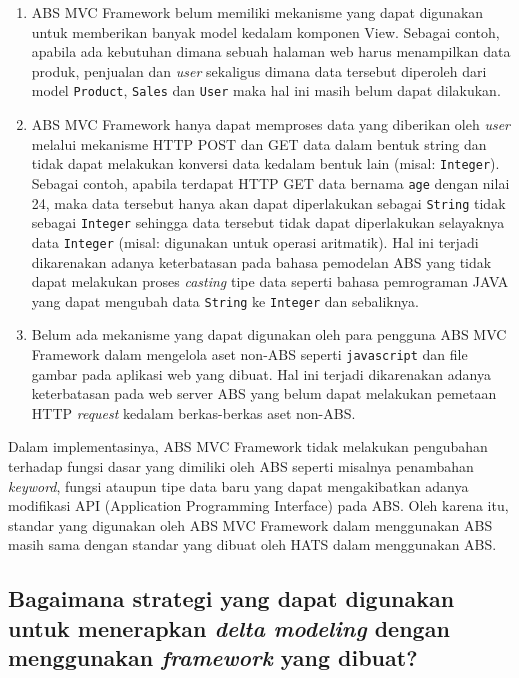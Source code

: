 \begin{enumerate}
    \item ABS MVC Framework belum memiliki mekanisme yang dapat digunakan untuk memberikan banyak model kedalam komponen View. Sebagai contoh, apabila ada kebutuhan dimana sebuah halaman web harus menampilkan data produk, penjualan dan \textit{user} sekaligus dimana data tersebut diperoleh dari model \texttt{Product}, \texttt{Sales} dan \texttt{User} maka hal ini masih belum dapat dilakukan.
    \item ABS MVC Framework hanya dapat memproses data yang diberikan oleh \textit{user} melalui mekanisme HTTP POST dan GET data dalam bentuk string dan tidak dapat melakukan konversi data kedalam bentuk lain (misal: \texttt{Integer}). Sebagai contoh, apabila terdapat HTTP GET data bernama \texttt{age} dengan nilai 24, maka data tersebut hanya akan dapat diperlakukan sebagai \texttt{String} tidak sebagai \texttt{Integer} sehingga data tersebut tidak dapat diperlakukan selayaknya data \texttt{Integer} (misal: digunakan untuk operasi aritmatik). Hal ini terjadi dikarenakan adanya keterbatasan pada bahasa pemodelan ABS yang tidak dapat melakukan proses \textit{casting} tipe data seperti bahasa pemrograman JAVA yang dapat mengubah data \texttt{String} ke \texttt{Integer} dan sebaliknya.
    \item Belum ada mekanisme yang dapat digunakan oleh para pengguna ABS MVC Framework dalam mengelola aset non-ABS seperti \texttt{javascript} dan file gambar pada aplikasi web yang dibuat. Hal ini terjadi dikarenakan adanya keterbatasan pada web server ABS yang belum dapat melakukan pemetaan HTTP \textit{request} kedalam berkas-berkas aset non-ABS. 
\end{enumerate}

Dalam implementasinya, ABS MVC Framework tidak melakukan pengubahan terhadap fungsi dasar yang dimiliki oleh ABS seperti misalnya penambahan \textit{keyword}, fungsi ataupun tipe data baru yang dapat mengakibatkan adanya modifikasi API (Application Programming Interface) pada ABS. Oleh karena itu, standar yang digunakan oleh ABS MVC Framework dalam menggunakan ABS masih sama dengan standar yang dibuat oleh HATS dalam menggunakan ABS.

\subsection{Bagaimana strategi yang dapat digunakan untuk menerapkan \textit{delta modeling} dengan menggunakan \textit{framework} yang dibuat?}

